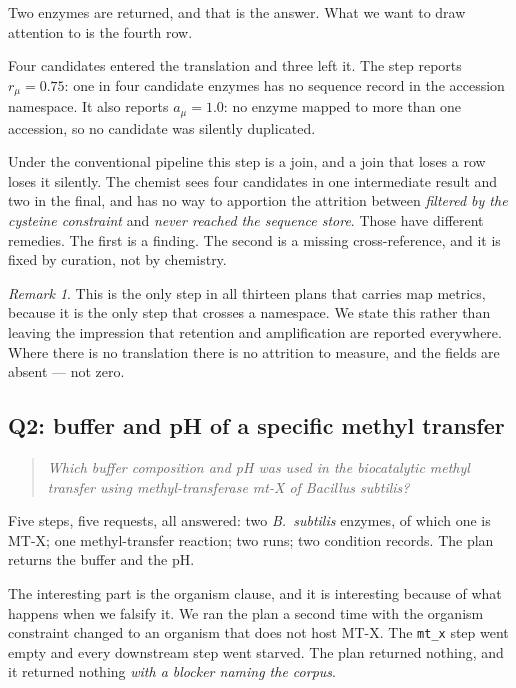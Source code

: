 \documentclass[11pt,a4paper]{article}
\theoremstyle{plain}
\theoremstyle{definition}
\theoremstyle{remark}
\newtheorem{remark}[theorem]{Remark}
\newcommand{\vans}{\textsf{answered}}
\newcommand{\vempty}{\textsf{empty}}
\newcommand{\vstarve}{\textsf{starved}}
\begin{document}
Two enzymes are returned, and that is the answer. What we want to draw
attention to is the fourth row.

Four candidates entered the translation and three left it. The step
reports $r_\mu = 0.75$: one in four candidate enzymes has no sequence
record in the accession namespace. It also reports $a_\mu = 1.0$: no
enzyme mapped to more than one accession, so no candidate was silently
duplicated.

Under the conventional pipeline this step is a join, and a join that
loses a row loses it silently. The chemist sees four candidates in one
intermediate result and two in the final, and has no way to apportion
the attrition between \emph{filtered by the cysteine constraint} and
\emph{never reached the sequence store}. Those have different remedies.
The first is a finding. The second is a missing cross-reference, and it
is fixed by curation, not by chemistry.

\begin{remark}
This is the only step in all thirteen plans that carries map metrics,
because it is the only step that crosses a namespace. We state this
rather than leaving the impression that retention and amplification are
reported everywhere. Where there is no translation there is no
attrition to measure, and the fields are absent --- not zero.
\end{remark}

\subsection{Q2: buffer and pH of a specific methyl transfer}
\label{sec:q2}

\begin{quote}
\emph{Which buffer composition and pH was used in the biocatalytic
methyl transfer using methyl-transferase mt-X of Bacillus subtilis?}
\end{quote}

Five steps, five requests, all \vans: two \emph{B.\ subtilis} enzymes,
of which one is MT-X; one methyl-transfer reaction; two runs; two
condition records. The plan returns the buffer and the pH.

The interesting part is the organism clause, and it is interesting
because of what happens when we falsify it. We ran the plan a second
time with the organism constraint changed to an organism that does not
host MT-X. The \texttt{mt\_x} step went \vempty{} and every downstream
step went \vstarve{}. The plan returned nothing, and it returned
nothing \emph{with a blocker naming the corpus}.
\end{document}
